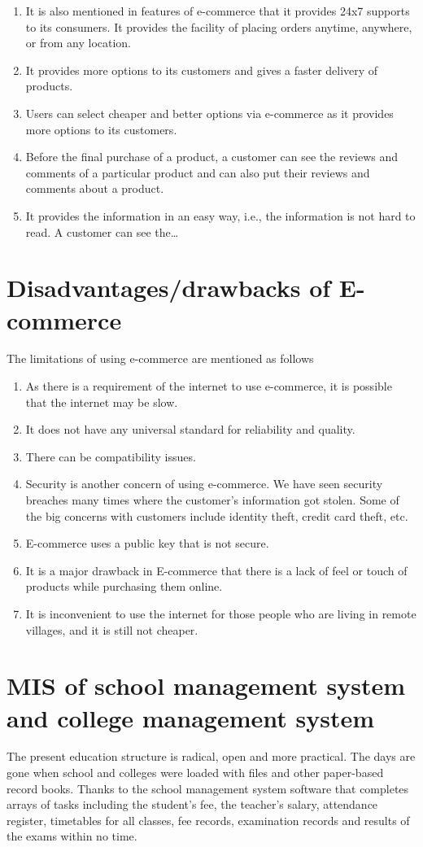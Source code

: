 \documentclass[a4paper]{article}
\begin{document}
\begin{enumerate}
  \item It is also mentioned in features of e-commerce that it provides
    24x7 supports to its consumers. It provides the facility of placing
    orders anytime, anywhere, or from any location.
  \item It provides more options to its customers and gives a faster
    delivery of products.
  \item Users can select cheaper and better options via e-commerce as it
    provides more options to its customers.
  \item Before the final purchase of a product, a customer can see the
    reviews and comments of a particular product and can also put their
    reviews and comments about a product.
  \item It provides the information in an easy way, i.e., the information
    is not hard to read. A customer can see the…
\end{enumerate}

\section{Disadvantages/drawbacks of E-commerce}
The limitations of using e-commerce are mentioned as follows

\begin{enumerate}
  \item As there is a requirement of the internet to use e-commerce, it is possible that the internet may be slow.
  \item It does not have any universal standard for reliability and quality.
  \item There can be compatibility issues.
  \item Security is another concern of using e-commerce. We have seen security breaches many times where the customer's information got stolen. Some of the big concerns with customers include identity theft, credit card theft, etc.
  \item E-commerce uses a public key that is not secure.
  \item It is a major drawback in E-commerce that there is a lack of feel or touch of products while purchasing them online.
  \item It is inconvenient to use the internet for those people who are living in remote villages, and it is still not cheaper.
\end{enumerate}

\section{MIS of school management system and college management system}
The present education structure is radical, open and more practical. The
days are gone when school and colleges were loaded with files and other
paper-based record books. Thanks to the school management system software
that completes arrays of tasks including the student’s fee, the teacher’s
salary, attendance register, timetables for all classes, fee records,
examination records and results of the exams within no time.
\end{document}

